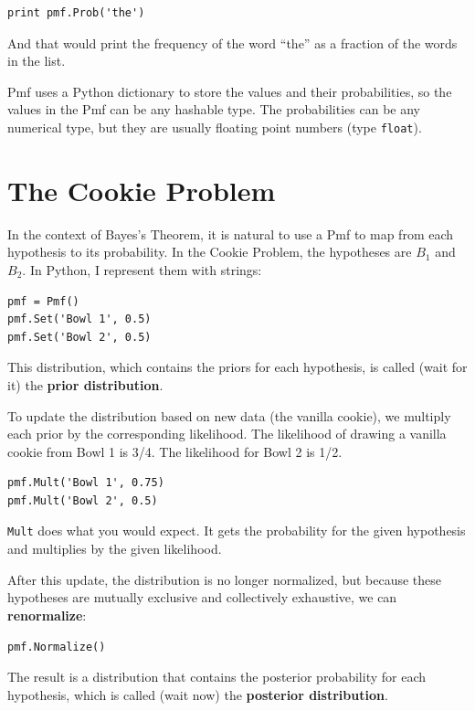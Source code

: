 \documentclass[12pt]{book}
\begin{document}
\begin{verbatim}
print pmf.Prob('the')
\end{verbatim}

And that would print the frequency of the word ``the'' as a fraction
of the words in the list.

Pmf uses a Python dictionary to store the values and their
probabilities, so the values in the Pmf can be any hashable type.
The probabilities can be any numerical type, but they are usually
floating point numbers (type \verb"float").


\section{The Cookie Problem}

In the context of Bayes's Theorem, it is natural to use a Pmf
to map from each hypothesis to its probability.  In the Cookie
Problem, the hypotheses are $B_1$ and $B_2$.  In Python, I
represent them with strings:

\begin{verbatim}
pmf = Pmf()
pmf.Set('Bowl 1', 0.5)
pmf.Set('Bowl 2', 0.5)
\end{verbatim}

This distribution, which contains the priors for each hypothesis,
is called (wait for it) the {\bf prior distribution}.

To update the distribution based on new data (the vanilla cookie),
we multiply each prior by the corresponding likelihood.  The likelihood
of drawing a vanilla cookie from Bowl 1 is 3/4.  The likelihood
for Bowl 2 is 1/2.

\begin{verbatim}
pmf.Mult('Bowl 1', 0.75)
pmf.Mult('Bowl 2', 0.5)
\end{verbatim}

\verb"Mult" does what you would expect.  It gets the probability
for the given hypothesis and multiplies by the given likelihood.

After this update, the distribution is no longer normalized, but
because these hypotheses are mutually exclusive and collectively
exhaustive, we can {\bf renormalize}:

\begin{verbatim}
pmf.Normalize()
\end{verbatim}

The result is a distribution that contains the posterior probability
for each hypothesis, which is called (wait now) the
{\bf posterior distribution}.
\end{document}
